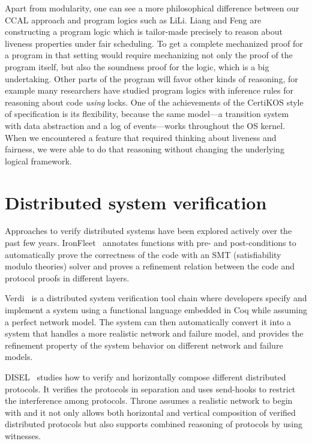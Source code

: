 Apart from modularity, one can see a more philosophical difference
between our CCAL approach and program logics such as LiLi.  Liang
and Feng are constructing a program logic which is tailor-made
precisely to reason about liveness properties under fair
scheduling. To get a complete mechanized proof for a program in that
setting would require mechanizing not only the proof of the program
itself, but also the soundness proof for the logic, which is a big
undertaking. Other parts of the program will favor other kinds of
reasoning, for example many researchers have studied program logics
with inference rules for reasoning about code \emph{using} locks. One
of the achievements of the CertiKOS style of specification is its
flexibility, because the same model---a transition system with data
abstraction and a log of events---works throughout the OS kernel. When
we encountered a feature that required thinking about liveness and
fairness, we were able to do that reasoning without changing the
underlying logical framework.


\section{Distributed system verification}

Approaches to verify distributed systems have been explored actively over the
past few years. IronFleet~\cite{ironfleet} annotates functions with pre- and
post-conditions to automatically prove the correctness of the code with an SMT (satisfiability
modulo theories) solver and proves a refinement relation between the code and
protocol proofs in different layers.

Verdi~\cite{verdi} is a distributed system verification tool chain
where developers specify and implement a system using a functional language
embedded in Coq while assuming a perfect network model. 
The system can then automatically convert
it into a system that handles a more realistic network and failure model,
and provides the refinement property of the system behavior on different network and failure models.

DISEL~\cite{disel}
studies how to verify and horizontally compose different distributed protocols.
It verifies the protocols in separation and uses send-hooks to restrict the
interference among protocols. Throne assumes a realistic network to begin with
and it not only allows both horizontal and vertical composition of verified distributed
protocols but also supports combined reasoning of protocols by using witnesses.

